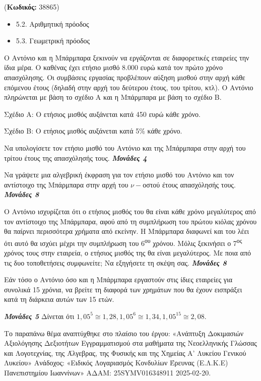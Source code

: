 \documentclass[11pt,a4paper,twoside]{book}
\newcounter{askhsh}[chapter]
\renewcommand{\theaskhsh}{
	\bf{\titlefont{\Large{\thechapter}}.\arabic{askhsh}}
}
\newcommand{\Askhsh}[2]{\refstepcounter{askhsh}{\titlefont{Άσκηση\theaskhsh} - \textcolor{maincolor}{ΘΕΜΑ #2}} ({\small{\textbf{Κωδικός:} #1}})\\}{}
\newenvironment{ylh}{
\begin{tcolorbox}[
breakable,
enhanced standard,
titlerule=0pt,
toprule=0pt, 
rightrule=0pt, 
bottomrule=0pt,
title={\titlefont Ύλη άσκησης},
colback=white,
opacityback=0,
left=2mm,
top=1mm,
bottom=0mm,
boxrule=0pt,
colframe=white,
borderline west={1.5mm}{0pt}{secondarycolor},
leftrule=2mm,
sharp corners,
coltitle=black
]
\begin{itemize}[leftmargin=3mm, itemsep=0mm, label=\textcolor{secondarycolor}{{\small\faBook}}]
}{
\end{itemize}
\end{tcolorbox}
}
\newcommand{\monades}[1]{
\hspace*{\fill}
\textbf{\textit{\textcolor{maincolor}{Μονάδες #1}}}}
\begin{document}
\vspace{4mm}
\Askhsh{38865}{4}
\begin{ylh}
    \item 5.2. Αριθμητική πρόοδος
    \item 5.3. Γεωμετρική πρόοδος
\end{ylh}

Ο Αντόνιο και η Μπάρμπαρα ξεκινούν να εργάζονται σε διαφορετικές εταιρείες την ίδια μέρα. Ο καθένας έχει ετήσιο μισθό 8.000 ευρώ κατά τον πρώτο χρόνο απασχόλησης. Οι συμβάσεις εργασίας προβλέπουν αύξηση μισθού στην αρχή κάθε επόμενου έτους (δηλαδή στην αρχή του δεύτερου έτους, του τρίτου, κτλ). Ο Αντόνιο πληρώνεται με βάση το σχέδιο Α και η Μπάρμπαρα με βάση το σχέδιο Β.

Σχέδιο Α: Ο ετήσιος μισθός αυξάνεται κατά 450 ευρώ κάθε χρόνο.

Σχέδιο Β: Ο ετήσιος μισθός αυξάνεται κατά 5\% κάθε χρόνο.

\begin{alist}
\item Να υπολογίσετε τον ετήσιο μισθό του Αντόνιο και της Μπάρμπαρα στην αρχή του τρίτου έτους της απασχόλησής τους.\monades{4}
\item Να γράψετε μια αλγεβρική έκφραση για τον ετήσιο μισθό του Αντόνιο και τον αντίστοιχο της Μπάρμπαρα στην αρχή του $\nu -$οστού έτους απασχόλησής τους.\monades{8}
\item Ο Αντόνιο ισχυρίζεται ότι ο ετήσιος μισθός του θα είναι κάθε χρόνο μεγαλύτερος από τον αντίστοιχο της Μπάρμπαρα, αφού από τη συμπλήρωση του πρώτου κιόλας χρόνου θα παίρνει περισσότερα χρήματα από εκείνην. Η Μπάρμπαρα διαφωνεί και του λέει ότι αυτό θα ισχύει μέχρι την συμπλήρωση του 6\textsuperscript{ου} χρόνου. Μόλις ξεκινήσει ο 7\textsuperscript{ος} χρόνος τους στην εταιρεία, ο ετήσιος μισθός της θα είναι μεγαλύτερος. Με ποια από τις δυο τοποθετήσεις συμφωνείτε; Να εξηγήσετε τη σκέψη σας.\monades{8}
\item Εάν τόσο ο Αντόνιο όσο και η Μπάρμπαρα εργαστούν στις ίδιες εταιρείες για συνολικά 15 χρόνια, να βρείτε τη διαφορά των χρημάτων που θα έχουν εισπράξει κατά τη διάρκεια αυτών των 15 ετών.
\monades{5}
Δίνεται ότι ${1,05}^{5} \cong 1,28, {1,05}^{6} \cong 1,34, {1,05}^{15} \cong 2,08$.

{\footnotesize Το παραπάνω θέμα αναπτύχθηκε στο πλαίσιο του έργου: «Ανάπτυξη Δοκιμασιών Αξιολόγησης Δεξιοτήτων Εγγραμματισμού στα μαθήματα της Νεοελληνικής Γλώσσας και Λογοτεχνίας, της Άλγεβρας, της Φυσικής και της Χημείας Α' Λυκείου Γενικού Λυκείου» Ανάδοχος: «Ειδικός Λογαριασμός Κονδυλίων Έρευνας (Ε.Λ.Κ.Ε) Πανεπιστημίου Ιωαννίνων» ΑΔΑΜ: 25SYMV016348911 2025-02-20.}
\end{alist}
\end{document}

